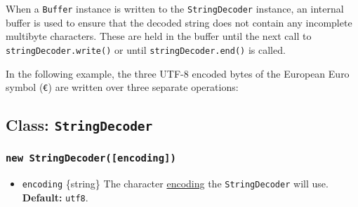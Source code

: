 When a \texttt{Buffer} instance is written to the \texttt{StringDecoder}
instance, an internal buffer is used to ensure that the decoded string
does not contain any incomplete multibyte characters. These are held in
the buffer until the next call to \texttt{stringDecoder.write()} or
until \texttt{stringDecoder.end()} is called.

In the following example, the three UTF-8 encoded bytes of the European
Euro symbol (\texttt{€}) are written over three separate operations:

\begin{Shaded}
\begin{Highlighting}[]
\OperatorTok{=} \NormalTok{(}\NormalTok{)}\OperatorTok{;}
\OperatorTok{=}  \NormalTok{(}\NormalTok{)}\OperatorTok{;}

\NormalTok{(}\NormalTok{([}\NormalTok{]))}\OperatorTok{;}
\NormalTok{(}\NormalTok{([}\NormalTok{]))}\OperatorTok{;}
\NormalTok{(}\NormalTok{([}\NormalTok{])))}\OperatorTok{;} 
\end{Highlighting}
\end{Shaded}

\subsection{\texorpdfstring{Class:
\texttt{StringDecoder}}{Class: StringDecoder}}\label{class-stringdecoder}

\subsubsection{\texorpdfstring{\texttt{new\ StringDecoder({[}encoding{]})}}{new StringDecoder({[}encoding{]})}}\label{new-stringdecoderencoding}

\begin{itemize}
\tightlist
\item
  \texttt{encoding} \{string\} The character
  \href{buffer.md\#buffers-and-character-encodings}{encoding} the
  \texttt{StringDecoder} will use. \textbf{Default:}
  \texttt{\textquotesingle{}utf8\textquotesingle{}}.
\end{itemize}

